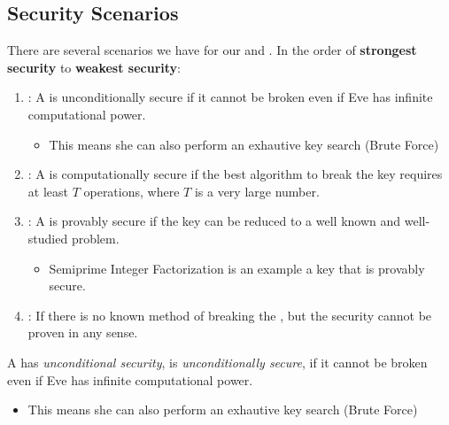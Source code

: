 \subsection{Security Scenarios}\label{subsec:Shannon_Security_Scenarios}
There are several scenarios we have for our  and .
In the order of \textbf{strongest security} to \textbf{weakest security}:
\begin{enumerate}[noitemsep]
\item \emph{}: A  is unconditionally secure if it cannot be broken even if Eve has infinite computational power.
  \begin{itemize}[noitemsep]
  \item This means she can also perform an exhautive key search (Brute Force)
  \end{itemize}
\item \emph{}: A  is computationally secure if the best algorithm to break the key requires at least $T$ operations, where $T$ is a very large number.
\item \emph{}: A  is provably secure if the key can be reduced to a well known and well-studied problem.
  \begin{itemize}[noitemsep]
  \item Semiprime Integer Factorization is an example a key that is provably secure.
  \end{itemize}
\item \emph{}: If there is no known method of breaking the , but the security cannot be proven in any sense.
\end{enumerate}

\begin{definition}\label{def:Security-Unconditional}
  A  has \emph{unconditional security}, is \emph{unconditionally secure}, if it cannot be broken even if Eve has infinite computational power.
  \begin{itemize}[noitemsep]
  \item This means she can also perform an exhautive key search (Brute Force)
  \end{itemize}
\end{definition}

